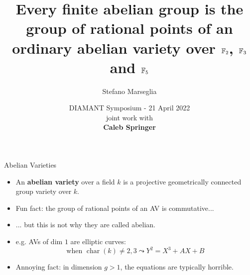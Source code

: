\documentclass[usenames,dvipsnames,handout]{beamer}
\title[]{Every finite abelian group is the group of rational points of an
ordinary abelian variety over $\mathbb{F}_2$, $\mathbb{F}_3$ and $\mathbb{F}_5$}
\subtitle{}
\author[Stefano Marseglia]{Stefano Marseglia\\}
\institute[]{Utrecht University}
\date[21 April 2022]{DIAMANT Symposium - 21 April 2022\\ \pause joint work with\\ {\bf Caleb Springer}}
\def\Z{\mathbb{Z}}
\def\C{\mathbb{C}}
\DeclareMathOperator{\Char}{char}
\newcommand{\set}[1]{\left\lbrace#1\right\rbrace }
\newcommand{\red}[1]{\textcolor{red}{#1}}
\begin{document}
\begin{frame}
\titlepage
\end{frame}


\begin{frame}{ Abelian Varieties }
    \begin{itemize}
        \item An {\bf abelian variety} over a field $k$ is a projective geometrically connected group variety over $k$.
        \pause
        \item Fun fact: the group of rational points of an AV is commutative...
        \pause
        \item ... but this is not why they are called abelian.
        \pause
        \item e.g. AVs of dim $1$ are elliptic curves:
        \[\text{when }\Char(k)\neq 2,3 \leadsto Y^2=X^3+AX+B  \]
        \pause
        \item \vspace{-6mm} Annoying fact: in dimension $g>1$, the equations are typically horrible.
	\end{itemize}
\end{frame}
\end{document}
